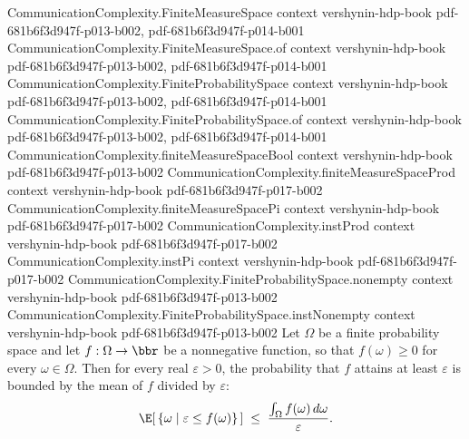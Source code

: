 \begin{theorem}
\label{CommunicationComplexity.FiniteProbabilitySpace.measureReal_ge_le_integral_div}
\leanok
{}
\proofstep
  {CommunicationComplexity.FiniteMeasureSpace}
  {context}
  {vershynin-hdp-book}
  {pdf-681b6f3d947f-p013-b002,
    pdf-681b6f3d947f-p014-b001}
\proofstep
  {CommunicationComplexity.FiniteMeasureSpace.of}
  {context}
  {vershynin-hdp-book}
  {pdf-681b6f3d947f-p013-b002,
    pdf-681b6f3d947f-p014-b001}
\proofstep
  {CommunicationComplexity.FiniteProbabilitySpace}
  {context}
  {vershynin-hdp-book}
  {pdf-681b6f3d947f-p013-b002,
    pdf-681b6f3d947f-p014-b001}
\proofstep
  {CommunicationComplexity.FiniteProbabilitySpace.of}
  {context}
  {vershynin-hdp-book}
  {pdf-681b6f3d947f-p013-b002,
    pdf-681b6f3d947f-p014-b001}
\proofstep
  {CommunicationComplexity.finiteMeasureSpaceBool}
  {context}
  {vershynin-hdp-book}
  {pdf-681b6f3d947f-p013-b002}
\proofstep
  {CommunicationComplexity.finiteMeasureSpaceProd}
  {context}
  {vershynin-hdp-book}
  {pdf-681b6f3d947f-p017-b002}
\proofstep
  {CommunicationComplexity.finiteMeasureSpacePi}
  {context}
  {vershynin-hdp-book}
  {pdf-681b6f3d947f-p017-b002}
\proofstep
  {CommunicationComplexity.instProd}
  {context}
  {vershynin-hdp-book}
  {pdf-681b6f3d947f-p017-b002}
\proofstep
  {CommunicationComplexity.instPi}
  {context}
  {vershynin-hdp-book}
  {pdf-681b6f3d947f-p017-b002}
\proofstep
  {CommunicationComplexity.FiniteProbabilitySpace.nonempty}
  {context}
  {vershynin-hdp-book}
  {pdf-681b6f3d947f-p013-b002}
\proofstep
  {CommunicationComplexity.FiniteProbabilitySpace.instNonempty}
  {context}
  {vershynin-hdp-book}
  {pdf-681b6f3d947f-p013-b002}
Let $\Omega$ be a finite probability space and let $f : \Omega \to \bbr$ be a
nonnegative function, so that $f(\omega) \ge 0$ for every $\omega \in \Omega$. Then for
every real $\varepsilon > 0$, the probability that $f$ attains at least $\varepsilon$ is
bounded by the mean of $f$ divided by $\varepsilon$:
\[
  \E\!\left[\,\{\omega \mid \varepsilon \le f(\omega)\}\,\right]
  \;\le\; \frac{\int_\Omega f(\omega)\,d\omega}{\varepsilon}.
\]
\end{theorem}


